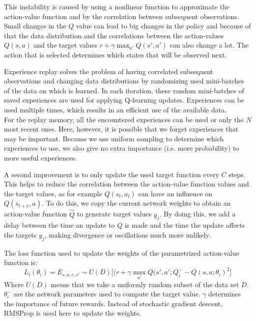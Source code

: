 This instability is caused by using a nonlinear function to approximate the action-value function and by the correlation between subsequent observations.
Small changes in the $Q$ value can lead to big changes in the policy and because of that the data distribution and the correlations between the action-values $Q(s,a)$ and the target values $r+\gamma \max_{a'} Q(s',a')$ can also change a lot.
The action that is selected determines which states that will be observed next.

Experience replay solves the problem of having correlated subsequent observations and changing data distributions by randomizing used mini-batches of the data on which is learned.
In each iteration, these random mini-batches of saved experiences are used for applying Q-learning updates.
Experiences can be used multiple times, which results in an efficient use of the available data.\\
For the replay memory, all the encountered experiences can be used or only the $N$ most recent ones.
Here, however, it is possible that we forget experiences that may be important.
Because we use uniform sampling to determine which experiences to use, we also give no extra importance (i.e. more probability) to more useful experiences.

A second improvement is to only update the used target function every $C$ steps.
This helps to reduce the correlation between the action-value function values and the target values, as for example $Q(s_t, a_t)$ can have an influence on $Q(s_{t+1},a)$.
To do this, we copy the current network weights to obtain an action-value function $\hat{Q}$ to generate target values $y_j$.
By doing this, we add a delay between the time an update to $Q$ is made and the time the update affects the targets $y_j$, making divergence or oscillations much more unlikely.

The loss function used to update the weights of the parametrized action-value function is:
\begin{equation}
L_i(\theta_i) = E_{s,a,r,s'} \sim U(D) \big [ (r + \gamma \max_{a'} Q(s',a'; Q^{-}_i - Q(s,a;\theta_i)^2 \big ]
\end{equation}
Where $U(D)$ means that we take a uniformly random subset of the data set $D$. $\theta^{-}_i$ are the network parameters used to compute the target value. $\gamma$ determines the importance of future rewards. Instead of stochastic gradient descent, RMSProp is used here to update the weights.\\


